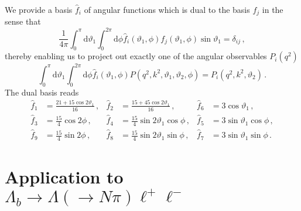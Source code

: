 \documentclass[aps,prd,reprint,nofootinbib,preprintnumbers]{revtex4}
\newcommand{\dd}{\text{d}}
\renewcommand{\theta}{\vartheta}
\begin{document}
We provide a basis $\hat{f}_i$ of angular functions which is dual to the basis $f_j$ in the sense that
\begin{equation}
    \frac{1}{4\pi}\int_0^\pi \dd\theta_1 \int_0^{2\pi}\dd \phi \hat{f}_i(\theta_1,\phi) f_j(\theta_1,\phi) \sin\theta_1 = \delta_{ij}\,,
\end{equation}
thereby enabling us to project out exactly one of the angular
observables $P_i(q^2)$
\begin{equation}
    \int_0^\pi \dd\theta_1 \int_0^{2\pi}\dd \phi \hat{f}_i(\theta_1,\phi) P(q^2, k^2, \theta_1,\theta_2,\phi) = P_i(q^2, k^2, \theta_2)\,.
\end{equation}
The dual basis reads
\begin{equation}
\begin{aligned}
    \hat{f}_1 & = \frac{21 + 15 \cos 2\theta_1}{16}\,, &
    \hat{f}_2 & = \frac{15 + 45 \cos 2\theta_1}{16}\,, &
    \hat{f}_6 & = 3 \cos\theta_1                   \,, \\
    \hat{f}_3 & = \frac{15}{4}                \cos 2\phi     \,, &
    \hat{f}_4 & = \frac{15}{4} \sin 2\theta_1 \cos  \phi     \,, &
    \hat{f}_5 & = 3            \sin  \theta_1 \cos  \phi     \,, \\
    \hat{f}_9 & = \frac{15}{4}                \sin 2\phi     \,, &
    \hat{f}_8 & = \frac{15}{4} \sin 2\theta_1 \sin  \phi     \,, &
    \hat{f}_7 & = 3            \sin  \theta_1 \sin  \phi     \,.
\end{aligned}
\end{equation}


\section{Application to $\Lambda_b\to \Lambda(\to N \pi)\ell^+\ell^-$}
\label{app:lambdabtolambdall}
\end{document}
